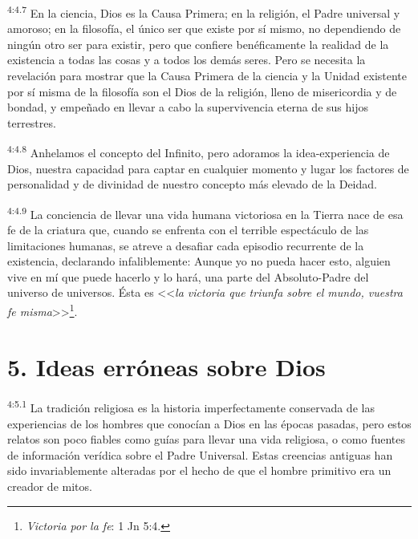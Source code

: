 \par
\textsuperscript{4:4.7} En la ciencia, Dios es la Causa Primera; en la religión, el Padre universal y amoroso; en la filosofía, el único ser que existe por sí mismo, no dependiendo de ningún otro ser para existir, pero que confiere benéficamente la realidad de la existencia a todas las cosas y a todos los demás seres. Pero se necesita la revelación para mostrar que la Causa Primera de la ciencia y la Unidad existente por sí misma de la filosofía son el Dios de la religión, lleno de misericordia y de bondad, y empeñado en llevar a cabo la supervivencia eterna de sus hijos terrestres.

\par
\textsuperscript{4:4.8} Anhelamos el concepto del Infinito, pero adoramos la idea-experiencia de Dios, nuestra capacidad para captar en cualquier momento y lugar los factores de personalidad y de divinidad de nuestro concepto más elevado de la Deidad.

\par
\textsuperscript{4:4.9} La conciencia de llevar una vida humana victoriosa en la Tierra nace de esa fe de la criatura que, cuando se enfrenta con el terrible espectáculo de las limitaciones humanas, se atreve a desafiar cada episodio recurrente de la existencia, declarando infaliblemente: Aunque yo no pueda hacer esto, alguien vive en mí que puede hacerlo y lo hará, una parte del Absoluto-Padre del universo de universos. Ésta es <<\textit{la victoria que triunfa sobre el mundo, vuestra fe misma}>>\footnote{\textit{Victoria por la fe}: 1 Jn 5:4.}.

\section*{5. Ideas erróneas sobre Dios}
\par
\textsuperscript{4:5.1} La tradición religiosa es la historia imperfectamente conservada de las experiencias de los hombres que conocían a Dios en las épocas pasadas, pero estos relatos son poco fiables como guías para llevar una vida religiosa, o como fuentes de información verídica sobre el Padre Universal. Estas creencias antiguas han sido invariablemente alteradas por el hecho de que el hombre primitivo era un creador de mitos.

